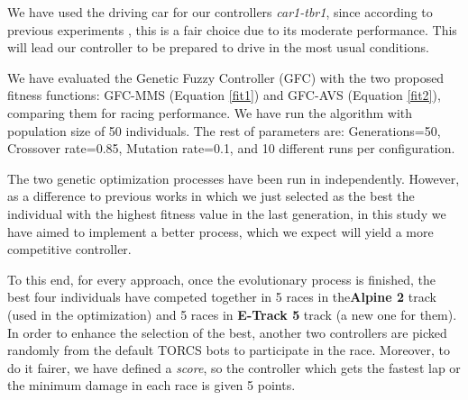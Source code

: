 \documentclass[conference]{IEEEtran}
\begin{document}
We have used the driving car for our controllers \textit{car1-tbr1}, since according to previous experiments \cite{evo17}, this is a fair choice due to its moderate performance. This will lead our controller to be prepared to drive in the most usual conditions. 

We have evaluated the Genetic Fuzzy Controller (GFC) with the two proposed fitness functions: GFC-MMS (Equation \ref{fit1}) and GFC-AVS (Equation \ref{fit2}), comparing them for racing performance. We have run the  algorithm with population size of 50 individuals. The rest of parameters are: Generations=50, Crossover rate=0.85, Mutation rate=0.1, and 10 different runs per configuration.



The two genetic optimization processes have been run in independently. However, as a difference to previous works in which we just selected as the best the individual with the highest fitness value in the last generation, in this study we have aimed to implement a better process, which we expect will yield a more competitive controller.

To this end, for every approach, once the evolutionary process is finished, the best four individuals have competed together in 5 races in the\textbf{Alpine 2} track (used in the optimization) and 5 races in \textbf{E-Track 5} track (a new one for them). 
In order to enhance the selection of the best, another two controllers are picked randomly from the default TORCS bots
to participate in the race. Moreover, to do it fairer, we have defined a \textit{score}, so the controller which gets the fastest lap or the minimum damage in each race is given 5 points.
\end{document}
